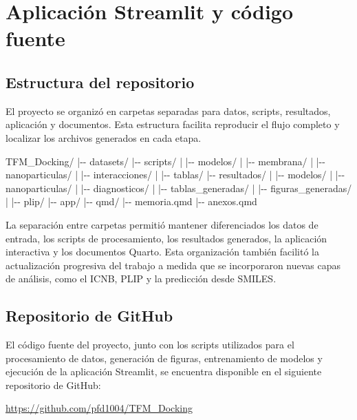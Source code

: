 \documentclass[
  spanish,
  a4paper,
  12pt,
  oneside,
  openany]{memoir}
\newenvironment{Shaded}{\begin{snugshade}}{\end{snugshade}}
\newcommand{\NormalTok}[1]{\textcolor[rgb]{0.00,0.23,0.31}{#1}}
\newcommand{\apendice}[1]{\chapter{#1}}
\begin{document}
\apendice{Aplicación Streamlit y código fuente}

\section{Estructura del repositorio}

El proyecto se organizó en carpetas separadas para datos, scripts,
resultados, aplicación y documentos. Esta estructura facilita reproducir
el flujo completo y localizar los archivos generados en cada etapa.

\begin{Shaded}
\begin{Highlighting}[]
\NormalTok{TFM\_Docking/}
\NormalTok{|{-}{-} datasets/}
\NormalTok{|{-}{-} scripts/}
\NormalTok{|   |{-}{-} modelos/}
\NormalTok{|   |{-}{-} membrana/}
\NormalTok{|   |{-}{-} nanoparticulas/}
\NormalTok{|   |{-}{-} interacciones/}
\NormalTok{|   |{-}{-} tablas/}
\NormalTok{|{-}{-} resultados/}
\NormalTok{|   |{-}{-} modelos/}
\NormalTok{|   |{-}{-} nanoparticulas/}
\NormalTok{|   |{-}{-} diagnosticos/}
\NormalTok{|   |{-}{-} tablas\_generadas/}
\NormalTok{|   |{-}{-} figuras\_generadas/}
\NormalTok{|   |{-}{-} plip/}
\NormalTok{|{-}{-} app/}
\NormalTok{|{-}{-} qmd/}
\NormalTok{|{-}{-} memoria.qmd}
\NormalTok{|{-}{-} anexos.qmd}
\end{Highlighting}
\end{Shaded}

La separación entre carpetas permitió mantener diferenciados los datos
de entrada, los scripts de procesamiento, los resultados generados, la
aplicación interactiva y los documentos Quarto. Esta organización
también facilitó la actualización progresiva del trabajo a medida que se
incorporaron nuevas capas de análisis, como el ICNB, PLIP y la
predicción desde SMILES.

\section{Repositorio de GitHub}

El código fuente del proyecto, junto con los scripts utilizados para el
procesamiento de datos, generación de figuras, entrenamiento de modelos
y ejecución de la aplicación Streamlit, se encuentra disponible en el
siguiente repositorio de GitHub:

\begin{center}
\url{https://github.com/pfd1004/TFM_Docking}
\end{center}
\end{document}
